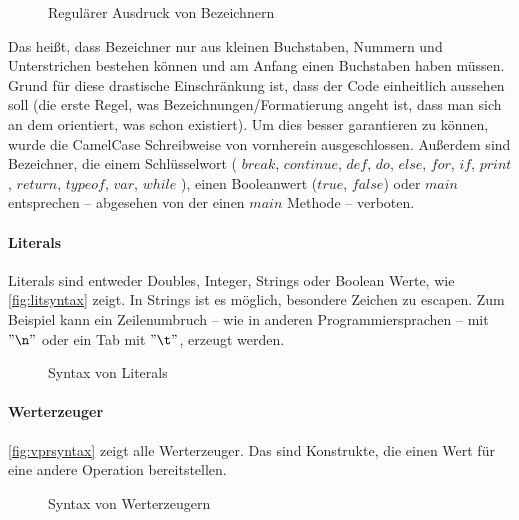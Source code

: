         \begin{figure}[H]
          \centering
          \caption{Regulärer Ausdruck von Bezeichnern}
          \label{fig:idsyntax}
        \end{figure}
        Das heißt, dass Bezeichner nur aus kleinen Buchstaben, Nummern und Unterstrichen bestehen können und am Anfang einen Buchstaben haben müssen. Grund für diese drastische Einschränkung ist, dass der Code einheitlich aussehen soll (die erste Regel, was Bezeichnungen/Formatierung angeht ist, dass man sich an dem orientiert, was schon existiert). Um dies besser garantieren zu können, wurde die CamelCase Schreibweise von vornherein ausgeschlossen. Außerdem sind Bezeichner, die einem Schlüsselwort
        (%
          \myMIn$break$,
          \myMIn$continue$,
          \myMIn$def$,
          \myMIn$do$,
          \myMIn$else$,
          \myMIn$for$,
          \myMIn$if$,
          \myMIn$print$,
          \myMIn$return$,
          \myMIn$typeof$,
          \myMIn$var$,
          \myMIn$while$%
        ), einen Booleanwert (\myMIn$true$, \myMIn$false$) oder \myMIn$main$ entsprechen -- abgesehen von der einen \myMIn$main$ Methode -- verboten.

      \paragraph{Literals}
        Literals sind entweder Doubles, Integer, Strings oder Boolean Werte, wie \autoref{fig:litsyntax} zeigt. In Strings ist es möglich, besondere Zeichen zu escapen. Zum Beispiel kann ein Zeilenumbruch -- wie in anderen Programmiersprachen -- mit \myMIn$"\n"$ oder ein Tab mit \myMIn$"\t"$, erzeugt werden.
        \begin{figure}[H]
          \centering
          \caption{Syntax von Literals}
          \label{fig:litsyntax}
        \end{figure}

      \paragraph{Werterzeuger}
        \autoref{fig:vprsyntax} zeigt alle Werterzeuger. Das sind Konstrukte, die einen Wert für eine andere Operation bereitstellen.
        \begin{figure}[H]
          \centering
          \caption{Syntax von Werterzeugern}
          \label{fig:vprsyntax}
        \end{figure}

